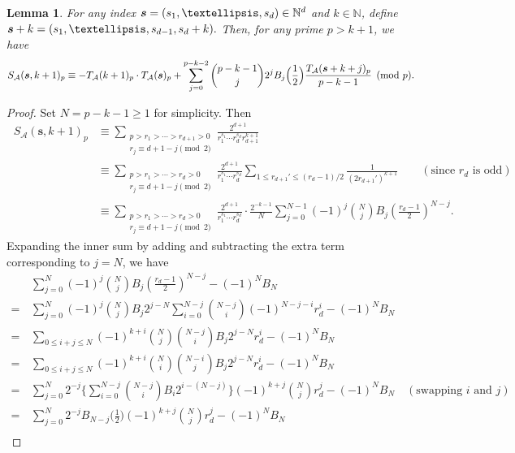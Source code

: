 \documentclass[10pt,a4paper]{amsart}
\newtheorem{lem}{Lemma}
\newcommand{\N}{\mathbb{N}}
\newcommand{\bfs}{{\boldsymbol{\sl{s}}}}
\newcommand{\calA}{\mathcal{A}}
\begin{document}
\begin{lem}\label{lem:S2(x)}
For any index $\bfs=(s_1,\dots,s_d)\in\N^d$ and $k\in\N$, define $\bfs+k=(s_1,\dots,s_{d-1},s_d+k).$
Then, for any prime $p>k+1$, we have
\begin{equation*}
S_\calA(\bfs,k+1)_p\equiv -T_\calA(k+1)_p \cdot T_\calA(\bfs)_p
+\sum_{j=0}^{p-k-2}\binom{p-k-1}{j} 2^jB_j\Big(\frac12\Big)\frac{T_{\calA}(\bfs+k+j)_p }{p-k-1}\pmod{p}.
\end{equation*}
\end{lem}

\begin{proof}
Set $N=p-k-1\ge 1$ for simplicity. Then
\begin{align*}
\ S_\calA(\mathbf s,k+1)_p&
\equiv\sum_{\substack{p>r_1>\cdots >r_{d+1}>0 \\ r_{j}\equiv d+1-j\pmod 2}} \frac{2^{d+1}}{r_1^{s_1}\cdots r_{d}^{s_d}r_{d+1}^{k+1}} \\
&\equiv\sum_{\substack{p>r_1>\cdots >r_{d}>0\\r_j\equiv d+1-j\pmod 2}} \frac{2^{d+1}}{r_1^{s_1}\cdots r_{d}^{s_d}}\sum_{1\le r_{d+1}'\le (r_{d}-1)/2}\frac{1}{(2r_{d+1}')^{k+1}} \qquad(\text{since $r_{d}$ is odd}) \\
&\equiv\sum_{\substack{p>r_1>\cdots >r_{d}>0\\r_j\equiv d+1-j\pmod 2}} \frac{2^{d+1}}{r_1^{s_1}\cdots r_{d}^{s_d}} \cdot\frac{2^{-k-1}}{N}\sum_{j=0}^{N-1}(-1)^j\binom{N}{j}B_j\left(\frac{r_{d}-1}{2}\right)^{N-j}.
\end{align*}
Expanding the inner sum by adding and subtracting the extra term corresponding to $j=N$, we have
\begin{align*}
&\,\sum_{j=0}^{N}(-1)^j\binom{N}{j}B_j\left(\frac{r_{d}-1}{2}\right)^{N-j}-(-1)^N B_N\\
=&\,
\sum_{j=0}^{N}(-1)^j\binom{N}{j}B_j2^{j-N}\sum_{i=0}^{N-j}\binom{N-j}{i}(-1)^{N-j-i}r_{d}^{i}-(-1)^N B_N\\
=&\, \sum_{0\le i+j\le N} (-1)^{k+i}\binom{N}{j}\binom{N-j}{i}B_j2^{j-N}r_{d}^{i} -(-1)^N B_N\\
=&\, \sum_{0\le i+j\le N} (-1)^{k+i}\binom{N}{i}\binom{N-i}{j}B_j2^{j-N}r_{d}^{i} -(-1)^N B_N\\
=&\, \sum_{j=0}^{N}2^{-j}\Bigg\{\sum_{i=0}^{N-j}\binom{N-j}{i}B_i2^{i-(N-j)}\Bigg\}(-1)^{k+j}\binom{N}{j}r_{d}^{j}-(-1)^N B_N \quad(\text{swapping $i$ and $j$})\\
=&\, \sum_{j=0}^{N}2^{-j}B_{N-j}\Big(\frac12\Big)(-1)^{k+j}\binom{N}{j}r_{d}^{j}-(-1)^N B_N\\

\end{align*}
\end{proof}
\end{document}
